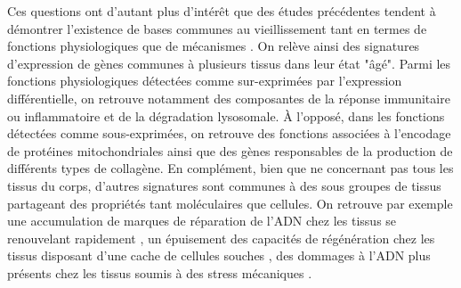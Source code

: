 Ces questions ont d'autant plus d'intérêt que des études précédentes tendent à démontrer l'existence de bases communes au vieillissement tant en termes de fonctions physiologiques que de mécanismes . On relève ainsi des signatures d'expression de gènes communes à plusieurs tissus dans leur état "âgé". Parmi les fonctions physiologiques détectées comme sur-exprimées par l'expression différentielle, on retrouve notamment des composantes de la réponse immunitaire ou inflammatoire et de la dégradation lysosomale. À l'opposé, dans les fonctions détectées comme sous-exprimées, on retrouve des fonctions associées à l'encodage de protéines mitochondriales ainsi que des gènes responsables de la production de différents types de collagène. En complément, bien que ne concernant pas tous les tissus du corps, d'autres signatures sont communes à des sous groupes de tissus partageant des propriétés tant moléculaires que cellules. On retrouve par exemple une accumulation de marques de réparation de l'ADN chez les tissus se renouvelant rapidement , un épuisement des capacités de régénération chez les tissus disposant d'une cache de cellules souches , des dommages à l'ADN plus présents chez les tissus soumis à des stress mécaniques .

